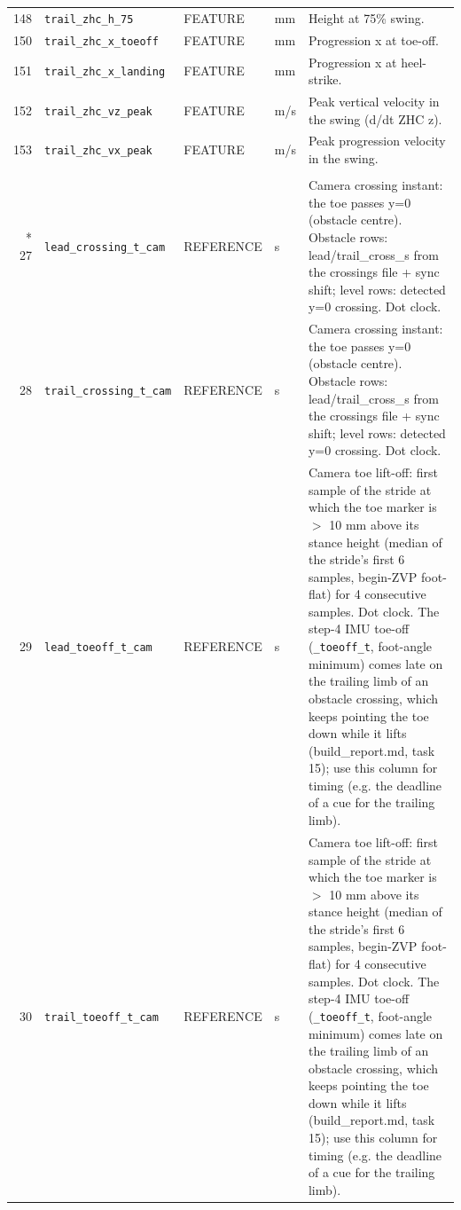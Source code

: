 \begin{longtable}{@{}r p{3.6cm} p{1.55cm} p{1.15cm} p{8.6cm}@{}}
148 & \texttt{trail\_\allowbreak{}zhc\_\allowbreak{}h\_\allowbreak{}75} & FEATURE & mm & Height at 75\% swing. \\
150 & \texttt{trail\_\allowbreak{}zhc\_\allowbreak{}x\_\allowbreak{}toeoff} & FEATURE & mm & Progression x at toe-off. \\
151 & \texttt{trail\_\allowbreak{}zhc\_\allowbreak{}x\_\allowbreak{}landing} & FEATURE & mm & Progression x at heel-strike. \\
152 & \texttt{trail\_\allowbreak{}zhc\_\allowbreak{}vz\_\allowbreak{}peak} & FEATURE & m/s & Peak vertical velocity in the swing (d/dt ZHC z). \\
153 & \texttt{trail\_\allowbreak{}zhc\_\allowbreak{}vx\_\allowbreak{}peak} & FEATURE & m/s & Peak progression velocity in the swing. \\
\addlinespace
\multicolumn{5}{@{}l}{\textbf{Camera reference values (never model inputs) (20)}} \\*
27 & \texttt{lead\_\allowbreak{}crossing\_\allowbreak{}t\_\allowbreak{}cam} & REFERENCE & s & Camera crossing instant: the toe passes y=0 (obstacle centre). Obstacle rows: lead/trail\_cross\_s from the crossings file + sync shift; level rows: detected y=0 crossing. Dot clock. \\
28 & \texttt{trail\_\allowbreak{}crossing\_\allowbreak{}t\_\allowbreak{}cam} & REFERENCE & s & Camera crossing instant: the toe passes y=0 (obstacle centre). Obstacle rows: lead/trail\_cross\_s from the crossings file + sync shift; level rows: detected y=0 crossing. Dot clock. \\
29 & \texttt{lead\_\allowbreak{}toeoff\_\allowbreak{}t\_\allowbreak{}cam} & REFERENCE & s & Camera toe lift-off: first sample of the stride at which the toe marker is $>$ 10 mm above its stance height (median of the stride's first 6 samples, begin-ZVP foot-flat) for 4 consecutive samples. Dot clock. The step-4 IMU toe-off (\texttt{\_\allowbreak{}toeoff\_\allowbreak{}t}, foot-angle minimum) comes late on the trailing limb of an obstacle crossing, which keeps pointing the toe down while it lifts (build\_report.md, task 15); use this column for timing (e.g. the deadline of a cue for the trailing limb). \\
30 & \texttt{trail\_\allowbreak{}toeoff\_\allowbreak{}t\_\allowbreak{}cam} & REFERENCE & s & Camera toe lift-off: first sample of the stride at which the toe marker is $>$ 10 mm above its stance height (median of the stride's first 6 samples, begin-ZVP foot-flat) for 4 consecutive samples. Dot clock. The step-4 IMU toe-off (\texttt{\_\allowbreak{}toeoff\_\allowbreak{}t}, foot-angle minimum) comes late on the trailing limb of an obstacle crossing, which keeps pointing the toe down while it lifts (build\_report.md, task 15); use this column for timing (e.g. the deadline of a cue for the trailing limb). \\

\end{longtable}
